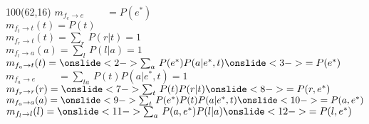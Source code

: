 \documentclass[shownotes,aspectratio=169]{beamer}
\begin{document}
\begin{frame}[plain]
\begin{textblock}{100}(62,16)
 $m_{f_e\rightarrow e}\phantom{(e)} = P(e^*) $  \\
 $m_{f_t\rightarrow t}(t) = P(t)$  \\
 $m_{f_r\rightarrow t}(t) = \sum_r \, P(r|t) = 1$  \\
 $m_{f_l\rightarrow a}(a) = \sum_l \, P(l|a) = 1 $  \\
 $m_{f_a\rightarrow t}(t) = \onslide<2->{\sum_{a} \, P(e^*) P(a|e^*,t)} \onslide<3->{= P(e^*)}$  \\
 $m_{f_a\rightarrow e}\phantom{(e)} = \sum_{ta} \, P(t) P(a|e^*,t) = 1$  \\
 $m_{f_r\rightarrow r}(r) = \onslide<7->{\sum_{t} \, P(t) P(r|t)} \onslide<8->{= P(r,e^*)}$ \\
 $m_{f_a\rightarrow a}(a) = \onslide<9->{\sum_{t} \, P(e^*)P(t)P(a|e^*,t)}\onslide<10->{  = P(a,e^*)}$  \\
 $m_{f_l\rightarrow l}(l) = \onslide<11->{\sum_{a} \, P(a,e^*) P(l|a)} \onslide<12->{ = P(l,e^*)}$
 \end{textblock}

 



\end{frame}
\end{document}
